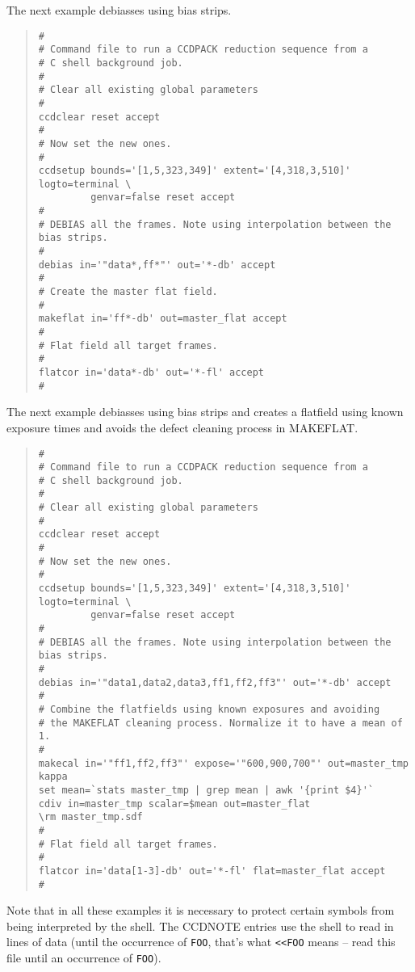 \documentclass[twoside,11pt]{article}
\newcommand{\htmlref}[2]{#1}
\newcommand{\latexhtml}[2]{#1}
\renewcommand{\_}{\texttt{\symbol{95}}}
\newcommand{\ttsize}{\latexhtml{\small}{}}
\newenvironment{myquote}{\begin{quote}\ttsize}{\end{quote}}
\newcommand{\text}[1]{{\ttsize \tt #1}}
\newcommand{\xroutine}[1]{\htmlref{{\sc #1}}{#1}}
\begin{document}
The next example debiasses using bias strips.

\newpage
\begin{center}
\end{center}

\begin{myquote}
\begin{verbatim}
#
# Command file to run a CCDPACK reduction sequence from a
# C shell background job.
#
# Clear all existing global parameters
#
ccdclear reset accept
#
# Now set the new ones.
#
ccdsetup bounds='[1,5,323,349]' extent='[4,318,3,510]' logto=terminal \
         genvar=false reset accept
#
# DEBIAS all the frames. Note using interpolation between the bias strips.
#
debias in='"data*,ff*"' out='*-db' accept
#
# Create the master flat field.
#
makeflat in='ff*-db' out=master_flat accept
#
# Flat field all target frames.
#
flatcor in='data*-db' out='*-fl' accept
#
\end{verbatim}
\end{myquote}

The next example debiasses using bias strips and creates a flatfield
using known exposure times and avoids the defect cleaning process in
\xroutine{MAKEFLAT}.

\begin{center}
\end{center}

\begin{myquote}
\begin{verbatim}
#
# Command file to run a CCDPACK reduction sequence from a
# C shell background job.
#
# Clear all existing global parameters
#
ccdclear reset accept
#
# Now set the new ones.
#
ccdsetup bounds='[1,5,323,349]' extent='[4,318,3,510]' logto=terminal \
         genvar=false reset accept
#
# DEBIAS all the frames. Note using interpolation between the bias strips.
#
debias in='"data1,data2,data3,ff1,ff2,ff3"' out='*-db' accept
#
# Combine the flatfields using known exposures and avoiding
# the MAKEFLAT cleaning process. Normalize it to have a mean of 1.
#
makecal in='"ff1,ff2,ff3"' expose='"600,900,700"' out=master_tmp
kappa
set mean=`stats master_tmp | grep mean | awk '{print $4}'`
cdiv in=master_tmp scalar=$mean out=master_flat
\rm master_tmp.sdf
#
# Flat field all target frames.
#
flatcor in='data[1-3]-db' out='*-fl' flat=master_flat accept
#
\end{verbatim}
\end{myquote}

Note that in all these examples it is necessary to protect certain
symbols from being interpreted by the shell. The
\xroutine{CCDNOTE} entries use the shell to read in lines of data (until the
occurrence of \text{FOO}, that's what \text{<<FOO} means -- read
this file until an occurrence of \text{FOO}).
\end{document}
